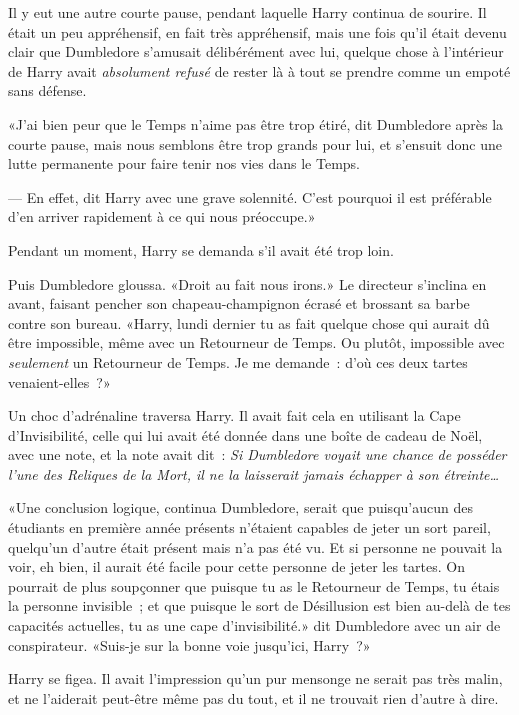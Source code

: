 Il y eut une autre courte pause, pendant laquelle Harry continua de sourire. Il était un peu appréhensif, en fait très appréhensif, mais une fois qu'il était devenu clair que Dumbledore s'amusait délibérément avec lui, quelque chose à l'intérieur de Harry avait \emph{absolument refusé} de rester là à tout se prendre comme un empoté sans défense.

«J'ai bien peur que le Temps n'aime pas être trop étiré, dit Dumbledore après la courte pause, mais nous semblons être trop grands pour lui, et s'ensuit donc une lutte permanente pour faire tenir nos vies dans le Temps.

--- En effet, dit Harry avec une grave solennité. C'est pourquoi il est préférable d'en arriver rapidement à ce qui nous préoccupe.»

Pendant un moment, Harry se demanda s'il avait été trop loin.

Puis Dumbledore gloussa. «Droit au fait nous irons.» Le directeur s'inclina en avant, faisant pencher son chapeau-champignon écrasé et brossant sa barbe contre son bureau. «Harry, lundi dernier tu as fait quelque chose qui aurait dû être impossible, même avec un Retourneur de Temps. Ou plutôt, impossible avec \emph{seulement} un Retourneur de Temps. Je me demande~: d'où ces deux tartes venaient-elles~?»

Un choc d'adrénaline traversa Harry. Il avait fait cela en utilisant la Cape d'Invisibilité, celle qui lui avait été donnée dans une boîte de cadeau de Noël, avec une note, et la note avait dit~: \emph{Si Dumbledore voyait une chance de posséder l'une des Reliques de la Mort, il ne la laisserait jamais échapper à son étreinte…}

«Une conclusion logique, continua Dumbledore, serait que puisqu'aucun des étudiants en première année présents n'étaient capables de jeter un sort pareil, quelqu'un d'autre était présent mais n'a pas été vu. Et si personne ne pouvait la voir, eh bien, il aurait été facile pour cette personne de jeter les tartes. On pourrait de plus soupçonner que puisque tu as le Retourneur de Temps, tu étais la personne invisible~; et que puisque le sort de Désillusion est bien au-delà de tes capacités actuelles, tu as une cape d'invisibilité.» dit Dumbledore avec un air de conspirateur. «Suis-je sur la bonne voie jusqu'ici, Harry~?»

Harry se figea. Il avait l'impression qu'un pur mensonge ne serait pas très malin, et ne l'aiderait peut-être même pas du tout, et il ne trouvait rien d'autre à dire.

